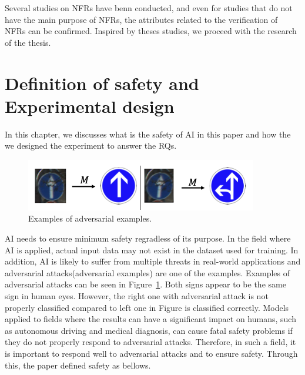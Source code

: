 \documentclass[journal,article,submit,moreauthors,pdftex]{Definitions/mdpi}
\begin{document}
Several studies on NFRs have benn conducted, and even for studies that do not have the main purpose of NFRs, the attributes related to the verification of NFRs can be confirmed.
Inspired by theses studies, we proceed with the research of the thesis.

\section{Definition of safety and Experimental design} %


In this chapter, we discusses what is the safety of AI in this paper and how the we designed the experiment to answer the RQs.

\begin{figure}[H]
\includegraphics[width=13 cm]{Definitions/example-of-adversarial.png}
\caption{Examples of adversarial examples.\label{example-of-adversarial}}
\end{figure}   

AI needs to ensure minimum safety regradless of its purpose. In the field where AI is applied, actual input data may not exist in the dataset used for training.
In addition, AI is likely to suffer from multiple threats in real-world applications and adversarial attacks(adversarial examples) are one of the examples.
Examples of adversarial attacks can be seen in Figure~\ref{example-of-adversarial}. Both signs appear to be the same sign in human eyes. However, the right one with adversarial attack is not properly classified compared to left one in Figure is classified correctly.
Models applied to fields where the results can have a significant impact on humans, such as autonomous driving and medical diagnosis, can cause fatal safety problems if they do not properly respond to adversarial attacks. Therefore, in such a field, it is important to respond well to adversarial attacks and to ensure safety.
Through this, the paper defined safety as bellows.
\end{document}

